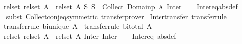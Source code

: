 \begin{isabellebody}
\ \ \ {\isachardoublequoteopen}{\isacharparenleft}{\kern0pt}rel{\isacharunderscore}{\kern0pt}set\ {\isacharparenleft}{\kern0pt}rel{\isacharunderscore}{\kern0pt}set\ A{\isacharparenright}{\kern0pt}\ {\isacharequal}{\kern0pt}{\isacharequal}{\kern0pt}{\isacharequal}{\kern0pt}{\isachargreater}{\kern0pt}\ rel{\isacharunderscore}{\kern0pt}set\ A{\isacharparenright}{\kern0pt}\ {\isacharparenleft}{\kern0pt}{\isasymlambda}S{\isachardot}{\kern0pt}\ {\isasymInter}S\ {\isasyminter}\ Collect\ {\isacharparenleft}{\kern0pt}Domainp\ A{\isacharparenright}{\kern0pt}{\isacharparenright}{\kern0pt}\ Inter{\isachardoublequoteclose}\isanewline
%
\isadelimproof
\ \ %
\endisadelimproof
%
\isatagproof
{}\isamarkupfalse%
\ Inter{\isacharunderscore}{\kern0pt}eq{\isacharbrackleft}{\kern0pt}abs{\isacharunderscore}{\kern0pt}def{\isacharbrackright}{\kern0pt}\isanewline
\ \ \isamarkupfalse%
\ {\isacharparenleft}{\kern0pt}subst\ Collect{\isacharunderscore}{\kern0pt}conj{\isacharunderscore}{\kern0pt}eq{\isacharbrackleft}{\kern0pt}symmetric{\isacharbrackright}{\kern0pt}{\isacharparenright}{\kern0pt}\ transfer{\isacharunderscore}{\kern0pt}prover%
\endisatagproof
{\isafoldproof}%
%
\isadelimproof
\isanewline
%
\endisadelimproof
\isanewline
{}\isamarkupfalse%
\ Inter{\isacharunderscore}{\kern0pt}transfer\ {\isacharbrackleft}{\kern0pt}transfer{\isacharunderscore}{\kern0pt}rule{\isacharbrackright}{\kern0pt}{\isacharcolon}{\kern0pt}\isanewline
\ \ \ {\isacharbrackleft}{\kern0pt}transfer{\isacharunderscore}{\kern0pt}rule{\isacharbrackright}{\kern0pt}{\isacharcolon}{\kern0pt}\ {\isachardoublequoteopen}bi{\isacharunderscore}{\kern0pt}unique\ A{\isachardoublequoteclose}\ \ {\isacharbrackleft}{\kern0pt}transfer{\isacharunderscore}{\kern0pt}rule{\isacharbrackright}{\kern0pt}{\isacharcolon}{\kern0pt}\ {\isachardoublequoteopen}bi{\isacharunderscore}{\kern0pt}total\ A{\isachardoublequoteclose}\isanewline
\ \ \ {\isachardoublequoteopen}{\isacharparenleft}{\kern0pt}rel{\isacharunderscore}{\kern0pt}set\ {\isacharparenleft}{\kern0pt}rel{\isacharunderscore}{\kern0pt}set\ A{\isacharparenright}{\kern0pt}\ {\isacharequal}{\kern0pt}{\isacharequal}{\kern0pt}{\isacharequal}{\kern0pt}{\isachargreater}{\kern0pt}\ rel{\isacharunderscore}{\kern0pt}set\ A{\isacharparenright}{\kern0pt}\ Inter\ Inter{\isachardoublequoteclose}\isanewline
%
\isadelimproof
\ \ %
\endisadelimproof
%
\isatagproof
{}\isamarkupfalse%
\ Inter{\isacharunderscore}{\kern0pt}eq\ {\isacharbrackleft}{\kern0pt}abs{\isacharunderscore}{\kern0pt}def{\isacharbrackright}{\kern0pt}\ \isamarkupfalse%

\end{isabellebody}
